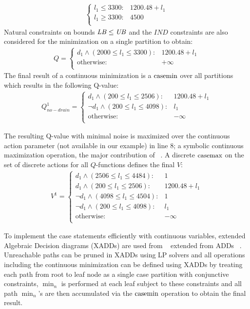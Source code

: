 \begin{itemize}
{\begin{align}
\begin{cases}
 l_1\leq  3300 :&  1200.48 + l_1 \\
  l_1\geq  3300 :&  4500 \\
\end{cases} \nonumber
\end{align}
}
Natural constraints on bounds $\mathit{LB} \leq \mathit{UB}$ and the $IND$ constraints are also considered for the minimization on a single partition to obtain: 
{\footnotesize
\begin{align}
Q =  
\begin{cases}
d_1 \land ( 2000 \leq l_1 \leq 3300 ):&  1200.48 + l_1 \\
\text{otherwise} :&  + \infty \\ 
\end{cases} \nonumber
\end{align}
}
The final result of a continuous minimization is a $\mathrm{casemin}$ over all partitions which results in the following Q-value:
{\footnotesize
\begin{align}
Q^1_{\mathit{no}-\mathit{drain}} =  
\begin{cases}
d_1 \land (200 \leq l_1 \leq 2506) : & 1200.48 + l_1 \\
\neg d_1 \land (200 \leq l_1 \leq 4098) : & l_1 \\
\text{otherwise} : & -\infty \\ 
\end{cases} \nonumber
\end{align}
}

The resulting Q-value with minimal noise is maximized over the continuous action parameter (not available in our example) in line 8; a symbolic continuous maximization operation, the major contribution of ~\cite{sdp_aaai}. A discrete $\mathrm{casemax}$ on the set of discrete actions for all $Q$-functions defines the final $V$:
{\footnotesize
\begin{align}
V^1 =  
\begin{cases}
d_1 \land (2506 \leq l_1 \leq 4484): & 1 \\
d_1 \land (200 \leq l_1 \leq 2506): & 1200.48 + l_1 \\
\neg d_1 \land (4098 \leq l_1 \leq 4504) : & 1 \\
\neg d_1 \land (200 \leq l_1 \leq 4098) : & l_1 \\
\text{otherwise} : & -\infty \\ 
\end{cases} \nonumber
\end{align}
}
\end{itemize}

To implement the case statements efficiently with continuous variables, extended Algebraic Decision diagrams (XADDs) are used from ~\cite{sanner_uai11} extended from ADDs ~\cite{bahar93add}. Unreachable paths can be pruned in XADDs using LP solvers and all operations including the continuous minimization can be defined using XADDs by treating each path from root to leaf node as a single case partition with conjunctive constraints,  $\min_n$ is performed at each leaf subject to these constraints and all path $\min_n$'s are then accumulated via the $\mathrm{casemin}$ operation to obtain the final result.

